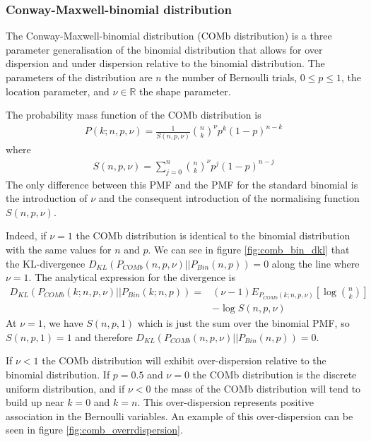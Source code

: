 \documentclass[a4paper,12pt]{article}
\theoremstyle{definition}
\begin{document}
      \subsubsection{Conway-Maxwell-binomial distribution}\label{sec:conway_maxwell_binomial_distribution}
      The Conway-Maxwell-binomial distribution (COMb distribution) is a three parameter generalisation of the binomial distribution that allows for over dispersion and under dispersion relative to the binomial distribution. The parameters of the distribution are $n$ the number of Bernoulli trials, $0 \leq p \leq 1$, the location parameter, and $\nu \in \mathbb{R}$ the shape parameter.

      The probability mass function of the COMb distribution is
      \begin{align}\label{eq:comb_pmf}
        P(k;n,p,\nu) = \frac{1}{S(n,p,\nu)}\binom{n}{k}^{\nu} p^k (1-p)^{n-k}
      \end{align}
      where
      \begin{align}\label{eq:comb_norm}
        S(n,p,\nu) = \sum_{j=0}^n \binom{n}{k}^{\nu} p^j (1-p)^{n-j}
      \end{align}
      The only difference between this PMF and the PMF for the standard binomial is the introduction of $\nu$ and the consequent introduction of the normalising function $S(n,p,\nu)$.

      Indeed, if $\nu = 1$ the COMb distribution is identical to the binomial distribution with the same values for $n$ and $p$. We can see in figure \ref{fig:comb_bin_dkl} that the KL-divergence $D_{KL}(P_{COMb}(n,p,\nu) || P_{Bin}(n,p))=0$ along the line where $\nu=1$. The analytical expression for the divergence is
      \begin{align}
        D_{KL}(P_{COMb}(k;n,p,\nu) || P_{Bin}(k;n,p)) = &(\nu - 1) E_{P_{COMb}(k;n,p,\nu)}\left[ \log \binom{n}{k} \right] \\
          &- \log S(n,p,\nu)
      \end{align}
      At $\nu = 1$, we have $S(n,p,1)$ which is just the sum over the binomial PMF, so $S(n,p,1) = 1$ and therefore $D_{KL}(P_{COMb}(n,p,\nu) || P_{Bin}(n,p))=0$.

      If $\nu < 1$ the COMb distribution will exhibit over-dispersion relative to the binomial distribution. If $p=0.5$ and $\nu=0$ the COMb distribution is the discrete uniform distribution, and if $\nu < 0$ the mass of the COMb distribution will tend to build up near $k=0$ and $k=n$. This over-dispersion represents positive association in the Bernoulli variables. An example of this over-dispersion can be seen in figure \ref{fig:comb_overrdispersion}.
\end{document}
